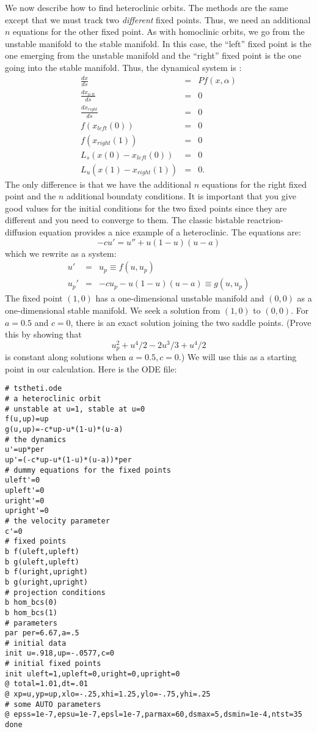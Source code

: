 \documentclass{article}
\begin{document}
We now describe how to find heteroclinic orbits. The methods are the
same except that we must track two {\em different} fixed points. Thus,
we need an additional $n$ equations for the other fixed point. As with
homoclinic orbits, we go from the unstable manifold to the stable
manifold. In this case, the ``left'' fixed point is the one emerging
from the unstable manifold and the ``right'' fixed point is the one
going into the stable manifold.  Thus, the dynamical system is :
\begin{eqnarray*}
\frac{dx}{ds} &=& P f(x,\alpha) \\
\frac{dx_{left}}{ds}&=& 0 \\
\frac{dx_{right}}{ds}&=& 0 \\
f(x_{left}(0)) &=& 0 \\
f(x_{right}(1)) &=& 0 \\
L_s (x(0)-x_{left}(0)) &=& 0 \\
L_u (x(1)-x_{right}(1)) &=& 0.
\end{eqnarray*}
The only difference is that we have the additional $n$ equations for
the right fixed point and the $n$ additional boundaty conditions.  It
is important that you give good values for the initial conditions for
the two fixed points since they are different and you need to converge
to them.  The classic bistable reactrion-diffusion equation provides a
nice example of a heteroclinic.  The equations are:
\[
-cu'=u''+u(1-u)(u-a)
\]
which we rewrite as a system:
\begin{eqnarray*}
u' &=& u_p \equiv f(u,u_p) \\
u_p' &=& -cu_p - u(1-u)(u-a) \equiv g(u,u_p)
\end{eqnarray*}
The fixed point $(1,0)$ has a one-dimensional unstable manifold and
$(0,0)$ as a one-dimensional stable manifold. We seek a solution from
$(1,0)$ to $(0,0).$  For $a=0.5$ and $c=0$, there is an exact solution
joining the two saddle points. (Prove this by showing that
\[
u_p^2 +u^4/2-2u^3/3+u^4/2
\]
is constant along solutions when $a=0.5,c=0.$) We will use this as a
starting point in our calculation.
Here is the ODE file:
\begin{verbatim}
# tstheti.ode
# a heteroclinic orbit
# unstable at u=1, stable at u=0
f(u,up)=up
g(u,up)=-c*up-u*(1-u)*(u-a)
# the dynamics
u'=up*per
up'=(-c*up-u*(1-u)*(u-a))*per
# dummy equations for the fixed points
uleft'=0
upleft'=0
uright'=0
upright'=0
# the velocity parameter
c'=0
# fixed points
b f(uleft,upleft)
b g(uleft,upleft)
b f(uright,upright)
b g(uright,upright)
# projection conditions
b hom_bcs(0)
b hom_bcs(1)
# parameters
par per=6.67,a=.5
# initial data
init u=.918,up=-.0577,c=0
# initial fixed points
init uleft=1,upleft=0,uright=0,upright=0
@ total=1.01,dt=.01
@ xp=u,yp=up,xlo=-.25,xhi=1.25,ylo=-.75,yhi=.25
# some AUTO parameters
@ epss=1e-7,epsu=1e-7,epsl=1e-7,parmax=60,dsmax=5,dsmin=1e-4,ntst=35
done
\end{verbatim}
\end{document}
